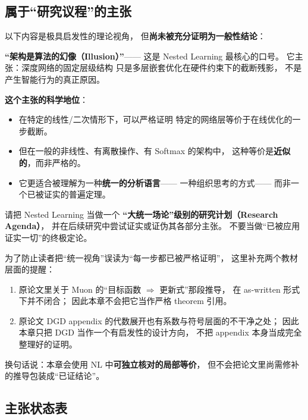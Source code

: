 \subsection*{属于``研究议程''的主张}

以下内容是极具启发性的理论视角，
但\textbf{尚未被充分证明为一般性结论}：

\begin{viewpointbox}
\textbf{``架构是算法的幻像（Illusion）''}——
这是 Nested Learning 最核心的口号。
它主张：深度网络的固定层级结构
只是多层嵌套优化在硬件约束下的截断残影，
不是产生智能行为的真正原因。

\textbf{这个主张的科学地位}：
\begin{itemize}
  \item 在特定的线性/二次情形下，可以严格证明
        特定的网络层等价于在线优化的一步截断。
  \item 但在一般的非线性、有离散操作、有 Softmax 的架构中，
        这种等价是\textbf{近似的}，而非严格的。
  \item 它更适合被理解为一种\textbf{统一的分析语言}——
        一种组织思考的方式——
        而非一个已被证实的普遍定理。
\end{itemize}

请把 Nested Learning 当做一个
\textbf{``大统一场论''级别的研究计划（Research Agenda）}，
并在后续研究中尝试证实或证伪其各部分主张。
不要当做``已被应用证实一切''的终极定论。
\end{viewpointbox}

\begin{remark}
为了防止读者把``统一视角''误读为``每一步都已被严格证明''，
这里补充两个教材层面的提醒：
\begin{enumerate}
  \item 原论文里关于 Muon 的``目标函数 $\Rightarrow$ 更新式''那段推导，
        在 as-written 形式下并不闭合；
        因此本章不会把它当作严格 theorem 引用。
  \item 原论文 DGD appendix 的代数展开也有系数与符号层面的不干净之处；
        因此本章只把 DGD 当作一个有启发性的设计方向，
        不把 appendix 本身当成完全整理好的证明。
\end{enumerate}
换句话说：本章会使用 NL 中\textbf{可独立核对的局部等价}，
但不会把论文里尚需修补的推导包装成``已证结论''。
\end{remark}

\subsection*{主张状态表}

